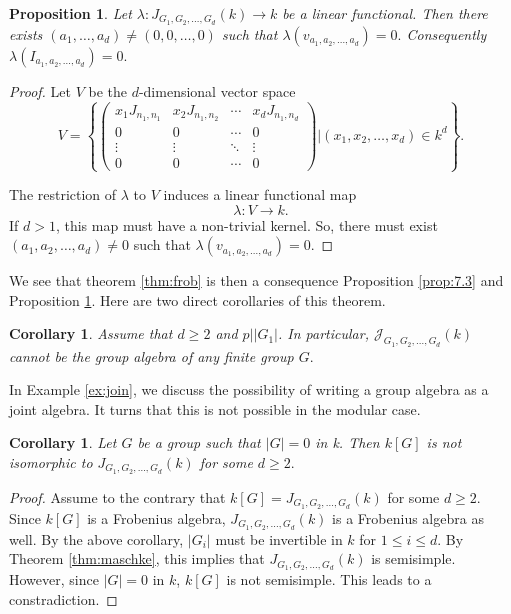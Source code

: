 \documentclass[12pt, a4paper]{amsart}
\numberwithin{equation}{section} %
\theoremstyle{plain}
\theoremstyle{definition}
\theoremstyle{plain}
\newtheorem{prop}[thm]{Proposition}
\newtheorem{cor}[thm]{Corollary}
\theoremstyle{remark}
\newcommand{\sJ}{\mathcal{J}}
\begin{document}
\begin{prop} \label{prop:7:4}
Let $\lambda: J_{G_1, G_2, \ldots, G_d}(k) \to k$ be a linear functional. Then there exists $(a_1, \ldots, a_d) \neq (0, 0, \ldots, 0)$ such that $\lambda(v_{a_1, a_2, \ldots, a_d})=0.$ Consequently $\lambda(I_{a_1, a_2, \ldots, a_d})=0.$
\end{prop}

\begin{proof}
Let $V$ be the $d$-dimensional vector space 
\[ V = \left\{ \left(\begin{array}{c|c|c|c}
x_1 J_{n_1, n_1} & x_{2} J_{n_1, n_2} & \cdots & x_{d}J_{n_1, n_d} \\
\hline
0  & 0 & \cdots & 0 \\
\hline
\vdots & \vdots & \ddots & \vdots \\
\hline
0 & 0  & \cdots &0 
\end{array}\right)| (x_1, x_2, \ldots, x_d) \in k^d  \right \} .\] 

The restriction of $\lambda$ to $V$ induces a linear functional map 
\[ \lambda: V \to k .\] 
If $d>1$, this map must have a non-trivial kernel. So, there must exist $(a_1, a_2, \ldots, a_d) \neq 0$ such that $\lambda(v_{a_1, a_2, \ldots, a_d})=0.$
\end{proof}
We see that theorem \ref{thm:frob} is then a consequence Proposition \ref{prop:7.3} and Proposition \ref{prop:7:4}. Here are two direct corollaries of this theorem. 
\begin{cor}
Assume that $d \geq 2$ and $p| |G_1|$.  In particular, $\sJ_{G_1, G_2, \ldots, G_d}(k)$ cannot be the group algebra of any finite group $G.$
\end{cor}

In Example \ref{ex:join}, we discuss the possibility of writing a group algebra as a joint algebra. It turns that this is not possible in the modular case. 
\begin{cor}
Let $G$ be a group such that $|G|=0$ in k. Then $k[G]$ is not isomorphic to $J_{G_1, G_2, \ldots, G_d}(k)$ for some $d \geq 2.$
\end{cor}
\begin{proof}
Assume to the contrary that $k[G]=J_{G_1, G_2, \ldots, G_d}(k)$ for some $d \geq 2.$ Since $k[G]$ is a Frobenius algebra, $J_{G_1, G_2, \ldots, G_d}(k)$ is a Frobenius algebra as well. By the above corollary, $|G_i|$ must be invertible in $k$ for $1 \leq i \leq d.$ By Theorem \ref{thm:maschke}, this implies that $J_{G_1, G_2, \ldots, G_d}(k)$ is semisimple. However, since $|G|=0$ in $k$, $k[G]$ is not semisimple. This leads to a constradiction. 

\end{proof}
\end{document}

